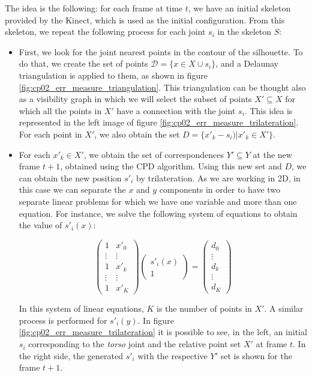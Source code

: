 The idea is the following: for each frame at time $t$, we have an initial skeleton provided by the Kinect, which is used as the initial configuration. From this skeleton, we repeat the following process for each joint $s_i$ in the skeleton $S$:
\begin{itemize}
 \item First, we look for the joint nearest points in the contour of the silhouette. To do that, we create the set of points $\mathcal{D} = \{ x \in X \cup s_i \}$, and a Delaunay triangulation \citep{lingas1994linear} is applied to them, as shown in figure \ref{fig:cp02_err_measure_triangulation}. This triangulation can be thought also as a visibility graph in which we will select the subset of points $X' \subseteq X$ for which all the points in $X'$ have a connection with the joint $s_i$. This idea is represented in the left image of figure \ref{fig:cp02_err_measure_trilateration}. For each point in $X'$, we also obtain the set $D = \{ x'_k - s_i) | x'_k \in X' \} $.
 \item For each $x'_k \in X'$, we obtain the set of correspondences $Y' \subseteq Y$ at the new frame $t + 1$, 
obtained using the CPD algorithm. Using this new set and $D$, we can obtain the new position $s'_i$ by 
trilateration. As we are working in 2D, in this case we can separate the $x$ and $y$ components in order to have two 
separate linear problems for which we have one variable and more than one equation. For instance, we solve the following system of equations to obtain the value of $s'_i(x)$:
 
 \begin{equation}
  \left( \begin{array}{cc}
1 & x'_0 \\
\vdots & \vdots \\
1 & x'_k \\
\vdots & \vdots \\
1 & x'_K \end{array} \right)
  \left( \begin{array}{c}
s'_i(x) \\
1 \end{array} \right) = 
  \left( \begin{array}{cc}
d_0 \\
\vdots \\
d_k \\
\vdots \\
d_K \end{array} \right)
 \end{equation}
 
In this system of linear equations, $K$ is the number of points in $X'$. A similar process is performed for $s'_i(y)$. In 
figure \ref{fig:cp02_err_measure_trilateration} it is possible to see, in the left, an initial $s_i$ corresponding to the 
\textit{torso} joint and the relative point set $X'$ at frame $t$. In the right side, the generated $s'_i$ with the 
respective $Y'$ set is shown for the frame $t + 1$.
\end{itemize}


